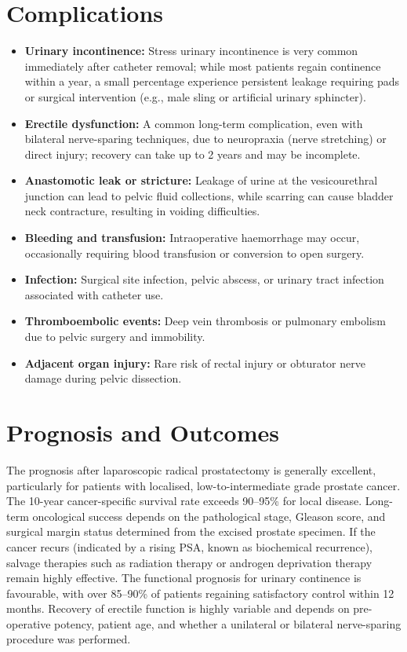 \section*{Complications}
\begin{itemize}
    \item \textbf{Urinary incontinence:} Stress urinary incontinence is very common immediately after catheter removal; while most patients regain continence within a year, a small percentage experience persistent leakage requiring pads or surgical intervention (e.g., male sling or artificial urinary sphincter).
    \item \textbf{Erectile dysfunction:} A common long-term complication, even with bilateral nerve-sparing techniques, due to neuropraxia (nerve stretching) or direct injury; recovery can take up to 2 years and may be incomplete.
    \item \textbf{Anastomotic leak or stricture:} Leakage of urine at the vesicourethral junction can lead to pelvic fluid collections, while scarring can cause bladder neck contracture, resulting in voiding difficulties.
    \item \textbf{Bleeding and transfusion:} Intraoperative haemorrhage may occur, occasionally requiring blood transfusion or conversion to open surgery.
    \item \textbf{Infection:} Surgical site infection, pelvic abscess, or urinary tract infection associated with catheter use.
    \item \textbf{Thromboembolic events:} Deep vein thrombosis or pulmonary embolism due to pelvic surgery and immobility.
    \item \textbf{Adjacent organ injury:} Rare risk of rectal injury or obturator nerve damage during pelvic dissection.
\end{itemize}

\section*{Prognosis and Outcomes}
The prognosis after laparoscopic radical prostatectomy is generally excellent, particularly for patients with localised, low-to-intermediate grade prostate cancer. The 10-year cancer-specific survival rate exceeds 90--95\% for local disease. Long-term oncological success depends on the pathological stage, Gleason score, and surgical margin status determined from the excised prostate specimen. If the cancer recurs (indicated by a rising PSA, known as biochemical recurrence), salvage therapies such as radiation therapy or androgen deprivation therapy remain highly effective. The functional prognosis for urinary continence is favourable, with over 85--90\% of patients regaining satisfactory control within 12 months. Recovery of erectile function is highly variable and depends on pre-operative potency, patient age, and whether a unilateral or bilateral nerve-sparing procedure was performed.

